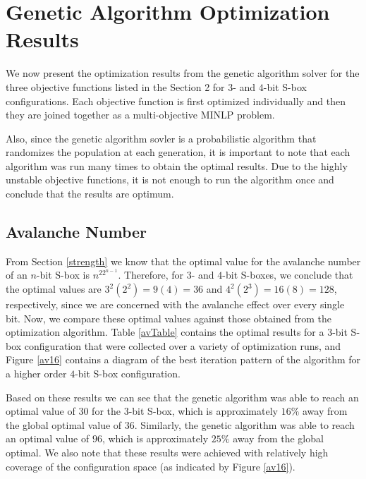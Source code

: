 \documentclass[11pt]{article}
\begin{document}
\section{Genetic Algorithm Optimization Results}

We now present the optimization results from the genetic algorithm solver for the three objective functions listed in the Section 2 for $3$- and $4$-bit S-box configurations. Each objective function is first optimized individually and then they are joined together as a multi-objective MINLP problem. 

Also, since the genetic algorithm sovler is a probabilistic algorithm that randomizes the population at each generation, it is important to note that each algorithm was run many times to obtain the optimal results. Due to the highly unstable objective functions, it is not enough to run the algorithm once and conclude that the results are optimum. 

\subsection{Avalanche Number}

From Section \ref{strength} we know that the optimal value for the avalanche number of an $n$-bit S-box is $n^22^{n-1}$. Therefore, for $3$- and $4$-bit S-boxes, we conclude that the optimal values are $3^2(2^2) = 9(4) = 36$ and $4^2(2^3) = 16(8) = 128$, respectively, since we are concerned with the avalanche effect over every single bit. Now, we compare these optimal values against those obtained from the optimization algorithm. Table \ref{avTable} contains the optimal results for a $3$-bit S-box configuration that were collected over a variety of optimization runs, and Figure \ref{av16} contains a diagram of the best iteration pattern of the algorithm for a higher order $4$-bit S-box configuration. 

Based on these results we can see that the genetic algorithm was able to reach an optimal value of $30$ for the $3$-bit S-box, which is approximately $16\%$ away from the global optimal value of $36$. Similarly, the genetic algorithm was able to reach an optimal value of $96$, which is approximately $25\%$ away from the global optimal. We also note that these results were achieved with relatively high coverage of the configuration space (as indicated by Figure \ref{av16}).
\end{document}
